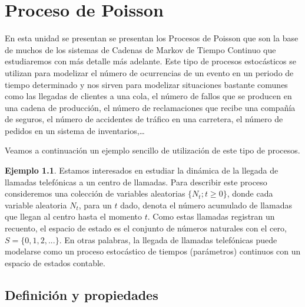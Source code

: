 \documentclass[
]{book}
\theoremstyle{definition}
\theoremstyle{definition}
\newtheorem{example}{Ejemplo}[chapter]
\theoremstyle{definition}
\theoremstyle{definition}
\theoremstyle{remark}
\begin{document}
\hypertarget{poissonprocess}{%
\chapter{Proceso de Poisson}\label{poissonprocess}}

En esta unidad se presentan se presentan los Procesos de Poisson que son la base de muchos de los sistemas de Cadenas de Markov de Tiempo Continuo que estudiaremos con más detalle más adelante. Este tipo de procesos estocásticos se utilizan para modelizar el número de ocurrencias de un evento en un periodo de tiempo determinado y nos sirven para modelizar situaciones bastante comunes como las llegadas de clientes a una cola, el número de fallos que se producen en una cadena de producción, el número de reclamaciones que recibe una compañía de seguros, el número de accidentes de tráfico en una carretera, el número de pedidos en un sistema de inventarios,\ldots{}

Veamos a continuación un ejemplo sencillo de utilización de este tipo de procesos.

\begin{example}
\protect\hypertarget{exm:pp001}{}\label{exm:pp001}Estamos interesados en estudiar la dinámica de la llegada de llamadas telefónicas a un centro de llamadas. Para describir este proceso consideremos una colección de variables aleatorias \(\{N_t; t ≥ 0\}\), donde cada variable aleatoria \(N_t\), para un \(t\) dado, denota el número acumulado de llamadas que llegan al centro hasta el momento \(t\). Como estas llamadas registran un recuento, el espacio de estado es el conjunto de números naturales con el cero, \(S= \{0,1,2,...\}\). En otras palabras, la llegada de llamadas telefónicas puede modelarse como un proceso estocástico de tiempos (parámetros) continuos con un espacio de estados contable.
\end{example}

\hypertarget{definiciuxf3n-y-propiedades}{%
\section{Definición y propiedades}\label{definiciuxf3n-y-propiedades}}
\end{document}
